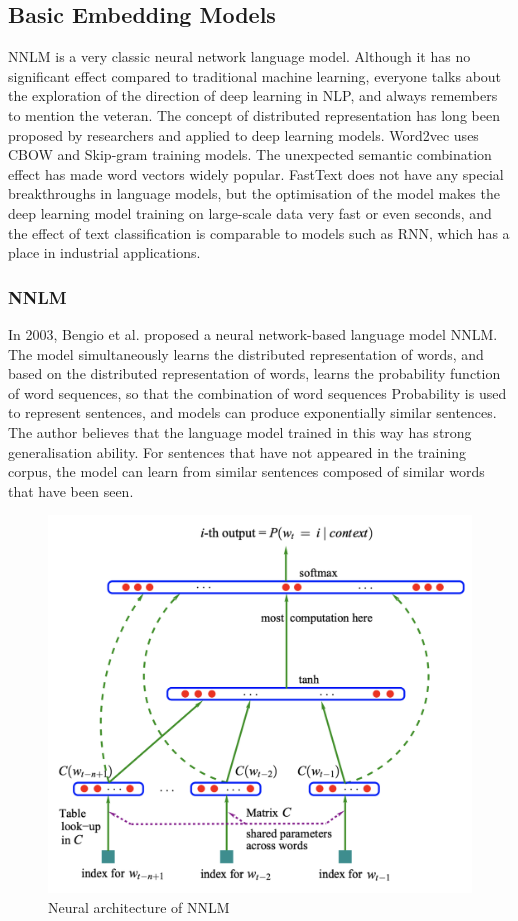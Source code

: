 \subsection{Basic Embedding Models}

NNLM is a very classic neural network language model. Although it has no significant effect compared to traditional machine learning, everyone talks about the exploration of the direction of deep learning in NLP, and always remembers to mention the veteran. The concept of distributed representation has long been proposed by researchers and applied to deep learning models. Word2vec uses CBOW and Skip-gram training models. The unexpected semantic combination effect has made word vectors widely popular. FastText does not have any special breakthroughs in language models, but the optimisation of the model makes the deep learning model training on large-scale data very fast or even seconds, and the effect of text classification is comparable to models such as RNN, which has a place in industrial applications.


\subsubsection{NNLM}

In 2003, Bengio et al. \cite{nnlm} proposed a neural network-based language model NNLM. The model simultaneously learns the distributed representation of words, and based on the distributed representation of words, learns the probability function of word sequences, so that the combination of word sequences Probability is used to represent sentences, and models can produce exponentially similar sentences. The author believes that the language model trained in this way has strong generalisation ability. For sentences that have not appeared in the training corpus, the model can learn from similar sentences composed of similar words that have been seen.

\begin{figure}[h!]
\centering
\includegraphics[width=.8\textwidth]{nnlm.pdf}
\caption{Neural architecture of NNLM \cite{nnlm}}
\label{fig:nnlm}
\end{figure}

